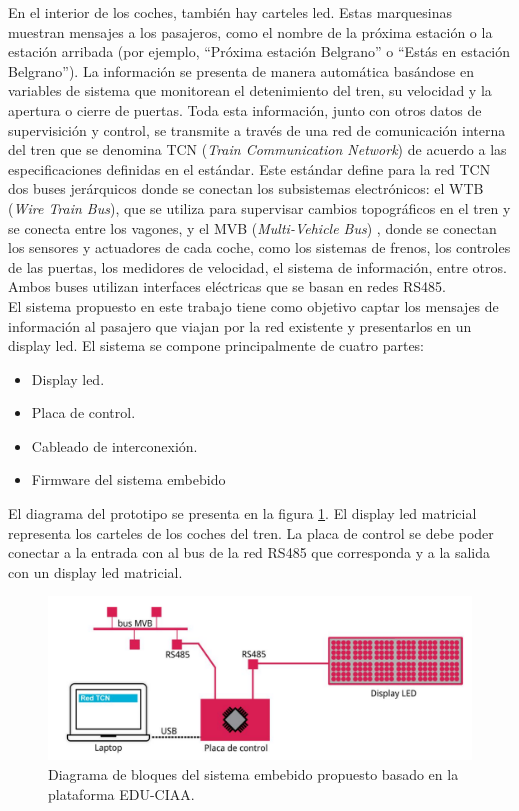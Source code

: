 En el interior de los coches, también hay carteles led. Estas marquesinas muestran mensajes a los pasajeros, como el nombre de la próxima estación o la estación arribada (por ejemplo, “Próxima estación Belgrano” o “Estás en estación Belgrano”). La información se
presenta de manera automática basándose en variables de sistema que monitorean el detenimiento del tren, su velocidad y la apertura o cierre de puertas. Toda esta información, junto con otros datos de supervisición y control, se transmite a través de una red de comunicación interna del tren que se denomina TCN (\textit{Train Communication Network}) de acuerdo a las especificaciones definidas en el estándar\citep{IEC-61375-1999}. Este estándar define para la red TCN dos buses jerárquicos donde se conectan los subsistemas electrónicos: el WTB (\textit{Wire Train Bus}), que se utiliza para supervisar cambios topográficos en el tren y se conecta entre los vagones, y el MVB (\textit{Multi-Vehicle Bus}) \citep{CSN-EN-61375-2-1}\citep{IEC-61375-3-1:2012}, donde se conectan los sensores y actuadores de cada coche, como los sistemas de frenos, los controles de las puertas, los medidores de velocidad, el sistema de información, entre otros. Ambos buses utilizan interfaces eléctricas que se basan en redes RS485.\\


 El sistema propuesto en este trabajo tiene como objetivo captar los mensajes de información al pasajero que viajan por la red existente y presentarlos en un display led. El sistema se compone principalmente de cuatro partes:
 \begin{itemize}
\item Display led.
\item Placa de control.
\item Cableado de interconexión.
\item Firmware del sistema embebido
 \end{itemize}

El diagrama del prototipo se presenta en la figura \ref{fig:diagramaPIDSCIAA}. El display led matricial representa los carteles de los coches del tren. La placa de control se debe poder conectar a la entrada con al bus de la red RS485 que corresponda y a la salida con un display led matricial.

\begin{figure}[ht]
	\centering
	\includegraphics[width=1\textwidth]{./Figures/diagramaPIDSCIAA.png}
	\caption{Diagrama de bloques del sistema embebido propuesto basado en la plataforma EDU-CIAA.}
	\label{fig:diagramaPIDSCIAA}
\end{figure}



